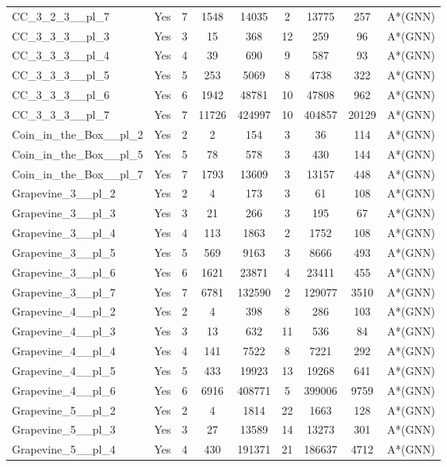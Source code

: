 \documentclass{article}
\begin{document}
\begin{tabular}{lcccccccc}
CC\_3\_2\_3\_\_pl\_7 & Yes & 7 & 1548 & 14035 & 2 & 13775 & 257 & A*(GNN) \\
CC\_3\_3\_3\_\_pl\_3 & Yes & 3 & 15 & 368 & 12 & 259 & 96 & A*(GNN) \\
CC\_3\_3\_3\_\_pl\_4 & Yes & 4 & 39 & 690 & 9 & 587 & 93 & A*(GNN) \\
CC\_3\_3\_3\_\_pl\_5 & Yes & 5 & 253 & 5069 & 8 & 4738 & 322 & A*(GNN) \\
CC\_3\_3\_3\_\_pl\_6 & Yes & 6 & 1942 & 48781 & 10 & 47808 & 962 & A*(GNN) \\
CC\_3\_3\_3\_\_pl\_7 & Yes & 7 & 11726 & 424997 & 10 & 404857 & 20129 & A*(GNN) \\
Coin\_in\_the\_Box\_\_pl\_2 & Yes & 2 & 2 & 154 & 3 & 36 & 114 & A*(GNN) \\
Coin\_in\_the\_Box\_\_pl\_5 & Yes & 5 & 78 & 578 & 3 & 430 & 144 & A*(GNN) \\
Coin\_in\_the\_Box\_\_pl\_7 & Yes & 7 & 1793 & 13609 & 3 & 13157 & 448 & A*(GNN) \\
Grapevine\_3\_\_pl\_2 & Yes & 2 & 4 & 173 & 3 & 61 & 108 & A*(GNN) \\
Grapevine\_3\_\_pl\_3 & Yes & 3 & 21 & 266 & 3 & 195 & 67 & A*(GNN) \\
Grapevine\_3\_\_pl\_4 & Yes & 4 & 113 & 1863 & 2 & 1752 & 108 & A*(GNN) \\
Grapevine\_3\_\_pl\_5 & Yes & 5 & 569 & 9163 & 3 & 8666 & 493 & A*(GNN) \\
Grapevine\_3\_\_pl\_6 & Yes & 6 & 1621 & 23871 & 4 & 23411 & 455 & A*(GNN) \\
Grapevine\_3\_\_pl\_7 & Yes & 7 & 6781 & 132590 & 2 & 129077 & 3510 & A*(GNN) \\
Grapevine\_4\_\_pl\_2 & Yes & 2 & 4 & 398 & 8 & 286 & 103 & A*(GNN) \\
Grapevine\_4\_\_pl\_3 & Yes & 3 & 13 & 632 & 11 & 536 & 84 & A*(GNN) \\
Grapevine\_4\_\_pl\_4 & Yes & 4 & 141 & 7522 & 8 & 7221 & 292 & A*(GNN) \\
Grapevine\_4\_\_pl\_5 & Yes & 5 & 433 & 19923 & 13 & 19268 & 641 & A*(GNN) \\
Grapevine\_4\_\_pl\_6 & Yes & 6 & 6916 & 408771 & 5 & 399006 & 9759 & A*(GNN) \\
Grapevine\_5\_\_pl\_2 & Yes & 2 & 4 & 1814 & 22 & 1663 & 128 & A*(GNN) \\
Grapevine\_5\_\_pl\_3 & Yes & 3 & 27 & 13589 & 14 & 13273 & 301 & A*(GNN) \\
Grapevine\_5\_\_pl\_4 & Yes & 4 & 430 & 191371 & 21 & 186637 & 4712 & A*(GNN) \\

\end{tabular}
\end{document}
